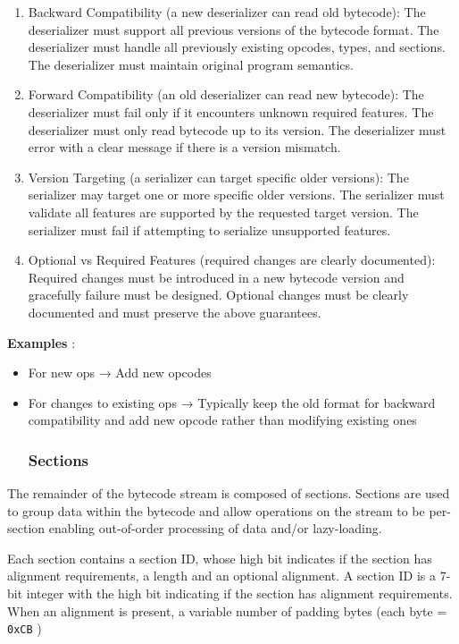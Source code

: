 \documentclass{article}
\begin{document}
\begin{enumerate}
\item Backward Compatibility (a new deserializer can read old bytecode): The deserializer must support all previous versions of the bytecode format. The deserializer must handle all previously existing opcodes, types, and sections. The deserializer must maintain original program semantics.
\item Forward Compatibility (an old deserializer can read new bytecode): The deserializer must fail only if it encounters unknown required features. The deserializer must only read bytecode up to its version. The deserializer must error with a clear message if there is a version mismatch.
\item Version Targeting (a serializer can target specific older versions): The serializer may target one or more specific older versions. The serializer must validate all features are supported by the requested target version. The serializer must fail if attempting to serialize unsupported features.
\item Optional vs Required Features (required changes are clearly documented): Required changes must be introduced in a new bytecode version and gracefully failure must be designed. Optional changes must be clearly documented and must preserve the above guarantees.

\end{enumerate}
\textbf{Examples} :


\begin{itemize}
\item For new ops → Add new opcodes
\item For changes to existing ops → Typically keep the old format for backward compatibility and add new opcode rather than modifying existing ones


\subsubsection{Sections}

\end{itemize}
The remainder of the bytecode stream is composed of sections.  Sections are used to group data within the bytecode and allow operations on the stream to be per-section enabling out-of-order processing of data and/or lazy-loading.

Each section contains a section ID, whose high bit indicates if the section has alignment requirements, a length and an optional alignment. A section ID is a 7-bit integer with the high bit indicating if the section has alignment requirements. When an alignment is present, a variable number of padding bytes (each byte = \texttt{0xCB} )
\end{document}
